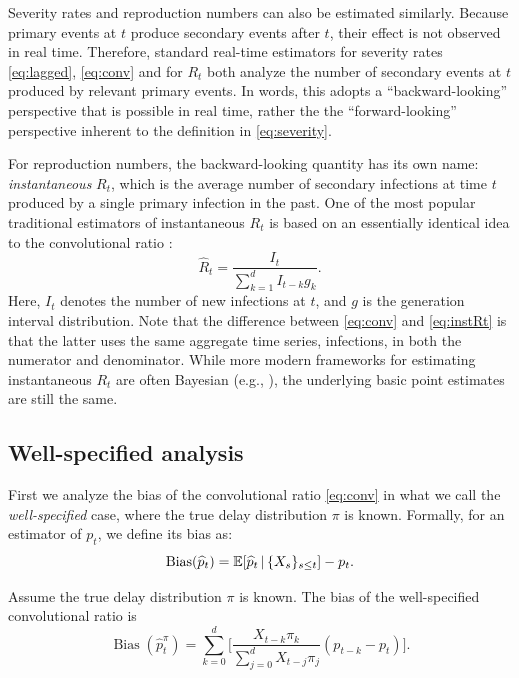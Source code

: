 \documentclass{article}
\renewcommand{\hat}{\widehat} %
\newcommand{\given}{\, \vert \,}
\DeclareMathOperator{\bias}{Bias}
\begin{document}
Severity rates and reproduction numbers can also be estimated similarly. Because
primary events at $t$ produce secondary events after $t$, their effect is not
observed in real time. Therefore, standard real-time estimators for severity
rates \eqref{eq:lagged}, \eqref{eq:conv} and for $R_t$ both analyze the number
of  secondary events at $t$ produced by relevant primary events. In words, this 
adopts a ``backward-looking'' perspective that is possible in real time, rather the 
the ``forward-looking'' perspective inherent to the definition in
\eqref{eq:severity}. 

For reproduction numbers, the backward-looking quantity has its own name:
\emph{instantaneous} $R_t$, which is the average number of secondary infections
at time $t$ produced by a single primary infection in the past. One of the most
popular traditional estimators of instantaneous $R_t$ is based on an essentially 
identical idea to the convolutional ratio \citep{fraser2007, wallinga2007how}: 
\begin{equation}
\label{eq:instRt}
\hat{R}_t = \frac{I_t}{\sum_{k=1}^d I_{t-k} g_k}.
\end{equation}
Here, $I_t$ denotes the number of new infections at $t$, and $g$ is the
generation interval distribution. Note that the difference between
\eqref{eq:conv} and \eqref{eq:instRt} is that the latter uses the same aggregate 
time series, infections, in both the numerator and denominator. While more
modern frameworks for estimating instantaneous $R_t$ are often Bayesian (e.g.,
\citealp{cori2013new}), the underlying basic point estimates are still the same.

\subsection{Well-specified analysis}
\label{sec:wellspecified}

First we analyze the bias of the convolutional ratio \eqref{eq:conv} in what we  
call the \emph{well-specified} case, where the true delay distribution $\pi$ is 
known. Formally, for an estimator \smash{$\hat{p}_t$} of $p_t$, we define its
bias as:     
\[
\bias(\hat{p}_t) = \E[\hat{p}_t \given \{X_s\}_{s\leq t}] - p_t. 
\]

\begin{proposition}
\label{prop:OracleBias}
Assume the true delay distribution $\pi$ is known.
The bias of the well-specified convolutional ratio \smash{$\hat{p}_t^\pi$} is 
\begin{equation}
\label{eq:OracleBias}
\bias(\hat{p}_t^\pi)  = \sum_{k=0}^d \Bigg[ \frac{X_{t-k}\pi_k}{\sum_{j=0}^d
  X_{t-j}\pi_j} (p_{t-k}-p_t) \Bigg]. 
\end{equation}
\end{proposition}
\end{document}
